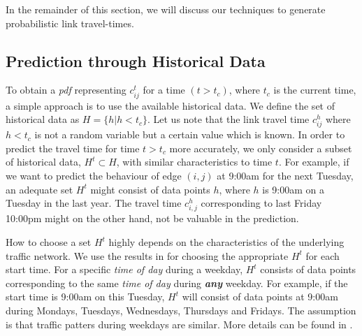 
In the remainder of this section, we will discuss our techniques to generate probabilistic link travel-times.

\subsection{Prediction through Historical Data}
\label{subsec:historical}
To obtain a \textit{pdf} representing $c_{ij}^t$ for a time $(t>t_c)$, where $t_c$ is the current time, a
simple approach is to use the available historical data. We define the set of historical data as $H = \{h | h < t_c\}$.
Let us note that the link travel time $c_{ij}^h$ where $ h < t_c$ is not a random variable but a certain value which is known. In order to predict the travel time for time $t > t_c$ more accurately, we only consider a subset of historical data, $H^t \subset H$, with similar characteristics to time $t$. For example, if we want to predict the behaviour of edge $(i,j)$ at 9:00am for the next Tuesday, an adequate set $H^t$ might consist of data points $h$, where $h$ is 9:00am on a Tuesday in the last year. The travel time $c_{i,j}^h$ corresponding to last Friday 10:00pm might on the other hand, not be valuable in the prediction.

How to choose a set $H^t$ highly depends on the characteristics of the underlying traffic network. We use the results in \cite{Pan12} for choosing the appropriate $H^t$ for each start time. For a specific \textit{time of day} during a weekday, $H^t$ consists of data points corresponding to the same \textit{time of day} during \textbf{\textit{any}} weekday. For example, if the start time is 9:00am on this Tuesday, $H^t$ will consist of data points at 9:00am during Mondays, Tuesdays, Wednesdays, Thursdays and Fridays. The assumption is that traffic patters during weekdays are similar. More details can be found in \cite{Pan12}.

